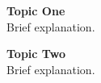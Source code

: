 {\small
  \noindent\textbf{Topic One}\\
  Brief explanation.\hspace*{\fill}

  \vspace{10pt}
  \noindent\textbf{Topic Two}\\
  Brief explanation.\hspace*{\fill}
}
